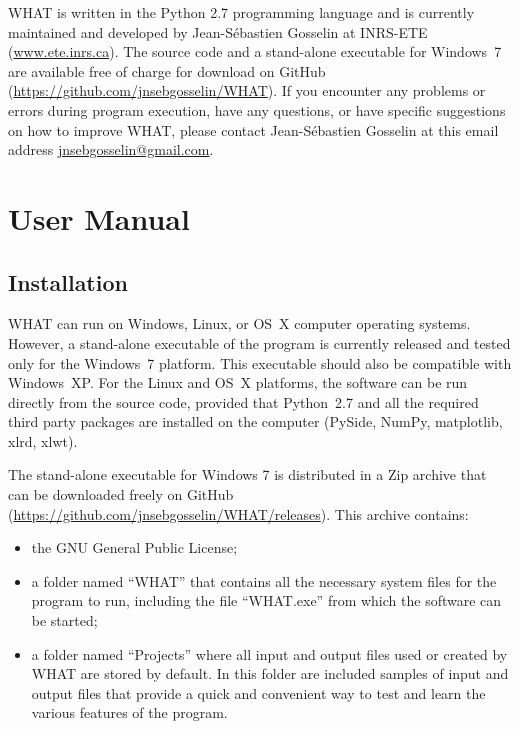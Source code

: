 \documentclass[12pt, letterpaper, fleqn]{report}
\begin{document}
WHAT is written in the Python 2.7 programming language and is currently maintained and developed by Jean-S\'ebastien Gosselin at INRS-ETE (\url{www.ete.inrs.ca}). The source code and a stand-alone executable for Windows 7 are available free of charge for download on GitHub (\url{https://github.com/jnsebgosselin/WHAT}). If you encounter any problems or errors during program execution, have any questions, or have specific suggestions on how to improve WHAT, please contact Jean-S\'ebastien Gosselin at this email address \href{mailto:jnsebgosselin@gmail.com}{jnsebgosselin@gmail.com}.

\listoffigures

\tableofcontents

\chapter{User Manual}

\section{Installation}\label{sec:intallation}

WHAT can run on Windows, Linux, or OS X computer operating systems. However, a stand-alone executable of the program is currently released and tested only for the Windows 7 platform. This executable should also be compatible with Windows XP. For the Linux and OS X platforms, the software can be run directly from the source code, provided that Python 2.7 and all the required third party packages are installed on the computer (PySide, NumPy, matplotlib, xlrd, xlwt).

The stand-alone executable for Windows 7 is distributed in a Zip archive that can be downloaded freely on GitHub (\url{https://github.com/jnsebgosselin/WHAT/releases}). This archive contains:

\begin{itemize}

\item{the GNU General Public License;}

\item{a folder named ``WHAT'' that contains all the necessary system files for the program to run, including the file ``WHAT.exe'' from which the software can be started;}

\item{a folder named ``Projects'' where all input and output files used or created by WHAT are stored by default. In this folder are included samples of input and output files that provide a quick and convenient way to test and learn the various features of the program.}

\end{itemize}
\end{document}
